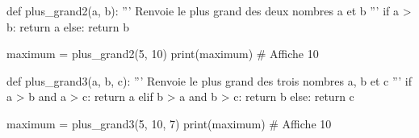 	\medskip

		
        \begin{minipage}{0.48\linewidth}
            \begin{CodePythontexAlt}[TaillePolice=\normalsize, Largeur=1\linewidth,Centre,PremLigne=1, Lignes=true,]{}
def plus_grand2(a, b):
    ''' Renvoie le plus grand des 
    deux nombres a et b '''
	if a > b:
		return a
	else:
		return b

maximum = plus_grand2(5, 10)
print(maximum) # Affiche 10
	\end{CodePythontexAlt}
        \end{minipage}\hfill{}
        \begin{minipage}{0.48\linewidth}
            \begin{CodePythontexAlt}[TaillePolice=\normalsize, Largeur=1\linewidth,Centre,PremLigne=1, Lignes=true,]{}
def plus_grand3(a, b, c):
    ''' Renvoie le plus grand des 
    trois nombres a, b et c '''
    if a > b and a > c:
		return a
	elif b > a and b > c:
		return b
	else:
		return c

maximum = plus_grand3(5, 10, 7)
print(maximum) # Affiche 10
		\end{CodePythontexAlt}
        \end{minipage}
